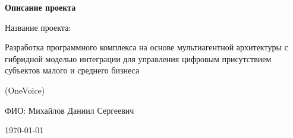 \thispagestyle{empty}
\begin{center}
  \vspace*{2cm}
  {\fontsize{16pt}{24pt}\selectfont\bfseries
    Описание проекта}

  \vspace{1.5cm}
  {\fontsize{14pt}{21pt}\selectfont
    Название проекта:}

  \vspace{0.5cm}
  {\fontsize{12pt}{18pt}\selectfont
    Разработка программного комплекса на основе мультиагентной архитектуры с гибридной моделью интеграции для управления цифровым присутствием субъектов малого и среднего бизнеса}

  \vspace{0.3cm}
  {\fontsize{11pt}{16pt}\selectfont
    (OneVoice)}

  \vspace{2cm}
  {\fontsize{14pt}{21pt}\selectfont
    ФИО: Михайлов Даниил Сергеевич}

  \vspace{2cm}
  {\fontsize{12pt}{18pt}\selectfont
    \today}
\end{center}
\clearpage
